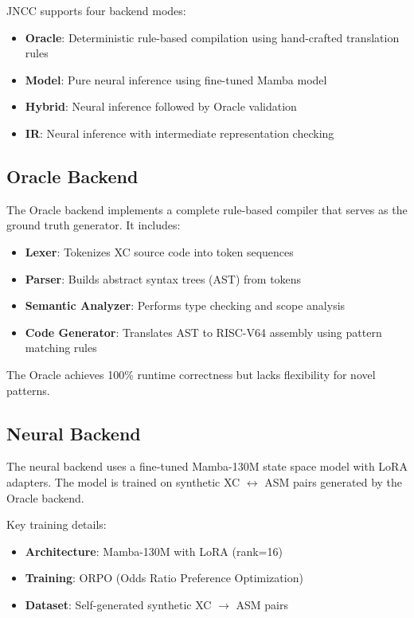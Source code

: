 \documentclass[12pt, a4paper, submitted, nofoot]{JNCCtemplate}
\begin{document}
JNCC supports four backend modes:

\begin{itemize}
    \item \textbf{Oracle}: Deterministic rule-based compilation using hand-crafted translation rules
    \item \textbf{Model}: Pure neural inference using fine-tuned Mamba model
    \item \textbf{Hybrid}: Neural inference followed by Oracle validation
    \item \textbf{IR}: Neural inference with intermediate representation checking
\end{itemize}

\subsection{Oracle Backend}

The Oracle backend implements a complete rule-based compiler that serves as the ground truth generator. It includes:

\begin{itemize}
    \item \textbf{Lexer}: Tokenizes XC source code into token sequences
    \item \textbf{Parser}: Builds abstract syntax trees (AST) from tokens
    \item \textbf{Semantic Analyzer}: Performs type checking and scope analysis
    \item \textbf{Code Generator}: Translates AST to RISC-V64 assembly using pattern matching rules
\end{itemize}

The Oracle achieves 100\% runtime correctness but lacks flexibility for novel patterns.

\subsection{Neural Backend}

The neural backend uses a fine-tuned Mamba-130M state space model with LoRA adapters. The model is trained on synthetic XC $\leftrightarrow$ ASM pairs generated by the Oracle backend.

Key training details:
\begin{itemize}
    \item \textbf{Architecture}: Mamba-130M with LoRA (rank=16)
    \item \textbf{Training}: ORPO (Odds Ratio Preference Optimization)
    \item \textbf{Dataset}: Self-generated synthetic XC $\rightarrow$ ASM pairs
\end{itemize}
\end{document}
